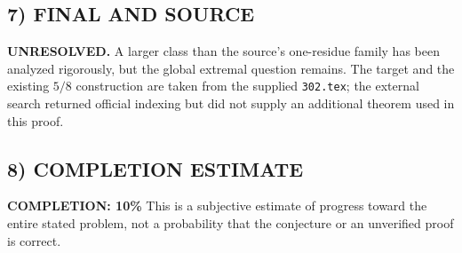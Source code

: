 \subsection*{7) FINAL AND SOURCE}
\textbf{UNRESOLVED.} A larger class than the source's one-residue family
has been analyzed rigorously, but the global extremal question remains.
The target and the existing $5/8$ construction are taken from the supplied
\texttt{302.tex}; the external search returned official indexing but did
not supply an additional theorem used in this proof.

\subsection*{8) COMPLETION ESTIMATE}
\textbf{COMPLETION: 10\%}
This is a subjective estimate of progress toward the entire stated problem, not a probability that the conjecture or an unverified proof is correct.
